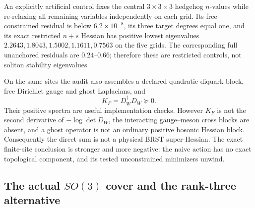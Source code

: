 \documentclass[11pt]{article}
\numberwithin{equation}{section}
\begin{document}
An explicitly artificial control fixes the central \(3\times3\times3\)
hedgehog \(n\)-values while re-relaxing all remaining variables independently
on each grid.  Its free constrained residual is below
\(6.2\times10^{-8}\), its three target degrees equal one, and its exact
restricted \(n+s\) Hessian has positive lowest eigenvalues
\(2.2643,1.8043,1.5002,1.1611,0.7563\) on the five grids.  The corresponding
full unanchored residuals are \(0.24\)--\(0.66\); therefore these are
restricted controls, not soliton stability eigenvalues.

On the same sites the audit also assembles a declared quadratic diquark
block, free Dirichlet gauge and ghost Laplacians, and
\begin{equation}
 K_F=D_W^\dagger D_W\succeq0.
 \label{eq:e7-fermion-normal}
\end{equation}
Their positive spectra are useful implementation checks.  However \(K_F\)
is not the second derivative of \(-\log\det D_W\), the interacting
gauge--meson cross blocks are absent, and a ghost operator is not an ordinary
positive bosonic Hessian block.  Consequently the direct sum is not a
physical BRST super-Hessian.  The exact finite-site conclusion is stronger
and more negative: the naive action has no exact topological component, and
its tested unconstrained minimizers unwind.

\subsection{The actual \texorpdfstring{\(SO(3)\)}{SO(3)} cover and the
rank-three alternative}
\end{document}
